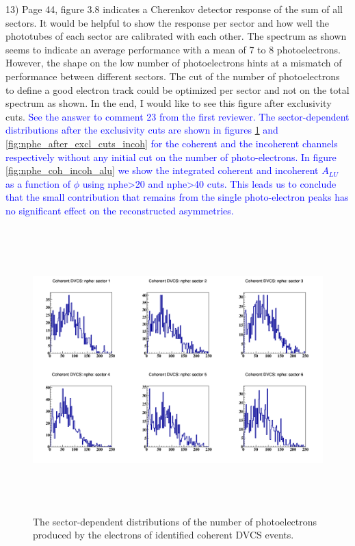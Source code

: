 13) Page 44, figure 3.8 indicates a Cherenkov detector response of the sum of all 
sectors. It would be helpful to show the response per sector and how well the 
phototubes of each sector are calibrated with each other. The spectrum as shown 
seems to indicate an average performance with a mean of 7 to 8 photoelectrons. 
However, the shape on the low number of photoelectrons hints at a mismatch of 
performance between different sectors.  The cut of the number of photoelectrons 
to define a good electron track could be optimized per sector and not on the 
total spectrum as shown. In the end, I would like to see this figure after 
exclusivity cuts.
\textcolor{blue}{ See the answer to comment 23 from the first reviewer. The 
   sector-dependent distributions after the exclusivity cuts are shown in 
figures \ref{fig:nphe_after_excl_cuts_coh} and 
\ref{fig:nphe_after_excl_cuts_incoh} for the coherent and the incoherent 
channels respectively without any initial cut on the number of photo-electrons.  
In figure \ref{fig:nphe_coh_incoh_alu} we show the integrated 
coherent and incoherent $A_{LU}$ as a function of $\phi$ using nphe>20 and 
nphe>40 cuts. This leads us to conclude that the small contribution that remains 
from the single photo-electron peaks has no significant effect on the 
reconstructed asymmetries.}\\

\begin{figure}[tbp]
   \hspace{-1.0 cm}
\includegraphics[height=11cm]{fig/e_nphe_coh.png}
\caption{The sector-dependent distributions of the number of photoelectrons 
produced by the electrons of identified coherent DVCS events. }
\label{fig:nphe_after_excl_cuts_coh}
\end{figure}

